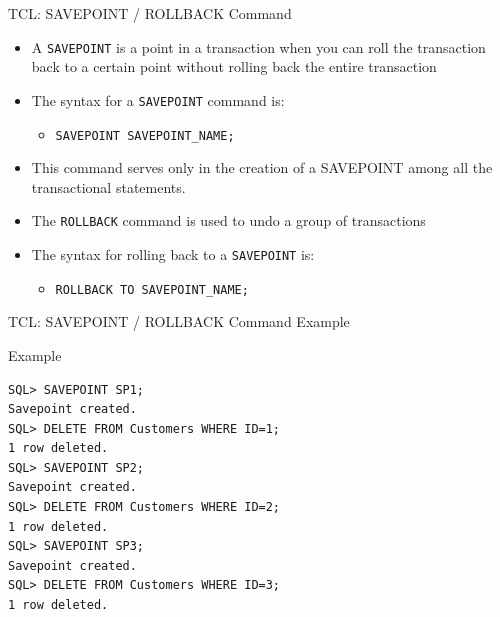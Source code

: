\documentclass[aspectratio=169, xcolor=dvipsnames]{beamer}
\begin{document}
\begin{frame}[fragile]{TCL: SAVEPOINT / ROLLBACK Command}
    \begin{itemize}[<+->]
        \item A \texttt{SAVEPOINT} is a point in a transaction when you can roll the transaction back to a certain point without rolling back the entire transaction
        \item The syntax for a \texttt{SAVEPOINT} command is:
        \begin{itemize}
            \item \texttt{SAVEPOINT SAVEPOINT\_NAME;}
        \end{itemize}
        \item This command serves only in the creation of a SAVEPOINT among all the transactional statements.
        \item The \texttt{ROLLBACK} command is used to undo a group of transactions
        \item The syntax for rolling back to a \texttt{SAVEPOINT} is:
        \begin{itemize}
            \item \texttt{ROLLBACK TO SAVEPOINT\_NAME;}
        \end{itemize}
    \end{itemize}
\end{frame}

\begin{frame}[fragile]{TCL: SAVEPOINT / ROLLBACK Command Example}
    \begin{exampleblock}{Example}
\begin{verbatim}
SQL> SAVEPOINT SP1;
Savepoint created.
SQL> DELETE FROM Customers WHERE ID=1;
1 row deleted.
SQL> SAVEPOINT SP2;
Savepoint created.
SQL> DELETE FROM Customers WHERE ID=2;
1 row deleted.
SQL> SAVEPOINT SP3;
Savepoint created.
SQL> DELETE FROM Customers WHERE ID=3;
1 row deleted.
\end{verbatim}
    \end{exampleblock}
\end{frame}
\end{document}
